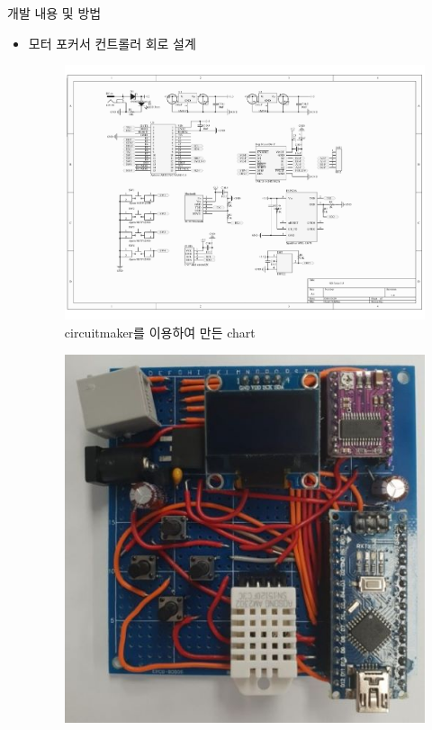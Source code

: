 \documentclass{gshs_poster_beamer}
\begin{document}
\begin{columns}[T]
\begin{posterbox}[colbacktitle=blue!50!black,coltitle=white,colback=cyan!5]{개발 내용 및 방법}
  \begin{itemize}
	\item 모터 포커서 컨트롤러 회로 설계
	\begin{figure}[h]
		\centering
		\includegraphics[scale=0.4]{Schematic_Prints}
		\caption{circuitmaker를 이용하여 만든 chart}
		\label{fig:Schematic_Prints}
	\end{figure}
	\begin{figure}[h]
		\centering
		\includegraphics[scale=0.6]{circuit1}

\end{figure}
\end{itemize}
\end{posterbox}
\end{columns}
\end{document}
